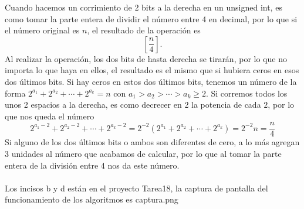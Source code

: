 \documentclass[12pt]{article}
\begin{document}
Cuando hacemos un corrimiento de 2 bits a la derecha en un unsigned int, es como tomar la parte entera de dividir el número entre 4 en decimal, por lo que si el número original es $n$, el resultado de la operación es \[ [\frac{n}{4}]. \]Al realizar la operación, los dos bits de hasta derecha se tirarán, por lo que no importa lo que haya en ellos, el resultado es el mismo que si hubiera ceros en esos dos últimos bits. Si hay ceros en estos dos últimos bits, tenemos un número de la forma $2^{a_1} + 2^{a_2} + \cdots + 2^{a_k} = n$ con $a_1 > a_2 > \cdots > a_k \geq 2$. Si corremos todos los unos 2 espacios a la derecha, es como decrecer en 2 la potencia de cada $2$, por lo que nos queda el número \[2^{a_1-2} + 2^{a_2-2} + \cdots + 2^{a_k-2} = 2^{-2} (2^{a_1} + 2^{a_2} + \cdots + 2^{a_k}) = 2^{-2} n = \frac{n}{4} \]Si alguno de los dos últimos bits o ambos son diferentes de cero, a lo más agregan 3 unidades al número que acabamos de calcular, por lo que al tomar la parte entera de la división entre 4 nos da este número. \\\\

Los incisos b y d están en el proyecto Tarea18, la captura de pantalla del funcionamiento de los algoritmos es captura.png
\end{document}
